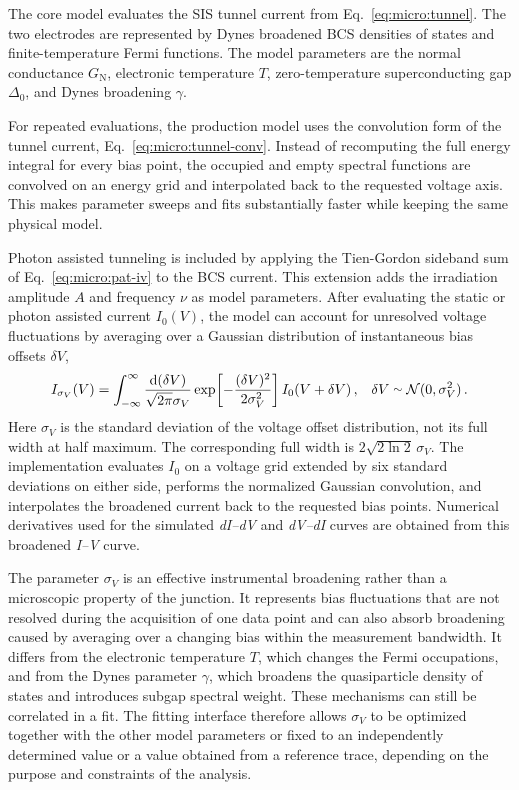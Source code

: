             The core model evaluates the SIS tunnel current from Eq.~\eqref{eq:micro:tunnel}. The two electrodes are represented by Dynes broadened BCS densities of states and finite-temperature Fermi functions. The model parameters are the normal conductance $G_\mathrm{N}$, electronic temperature $T$, zero-temperature superconducting gap $\Delta_0$, and Dynes broadening $\gamma$.

            For repeated evaluations, the production model uses the convolution form of the tunnel current, Eq.~\eqref{eq:micro:tunnel-conv}. Instead of recomputing the full energy integral for every bias point, the occupied and empty spectral functions are convolved on an energy grid and interpolated back to the requested voltage axis. This makes parameter sweeps and fits substantially faster while keeping the same physical model.

            Photon assisted tunneling is included by applying the Tien-Gordon sideband sum of Eq.~\eqref{eq:micro:pat-iv} to the BCS current. This extension adds the irradiation amplitude $A$ and frequency $\nu$ as model parameters. After evaluating the static or photon assisted current $I_0(V)$, the model can account for unresolved voltage fluctuations by averaging over a Gaussian distribution of instantaneous bias offsets $\delta V$,
            \begin{align}
                I_{\sigma_V}(V)
                = \int_{-\infty}^{\infty}
                \frac{\mathrm{d}(\delta V)}{\sqrt{2\pi}\sigma_V}
                \exp\!\left[-\frac{(\delta V)^2}{2\sigma_V^2}\right]
                I_0(V+\delta V)\,,
                &&
                \delta V\ssim\mathcal{N}(0,\sigma_V^2)\,.
                \label{eq:methods:digital:bcs:voltage-broadening}
            \end{align}
            Here $\sigma_V$ is the standard deviation of the voltage offset distribution, not its full width at half maximum. The corresponding full width is $2\sqrt{2\ln 2}\,\sigma_V$. The implementation evaluates $I_0$ on a voltage grid extended by six standard deviations on either side, performs the normalized Gaussian convolution, and interpolates the broadened current back to the requested bias points. Numerical derivatives used for the simulated \textit{dI--dV} and \textit{dV--dI} curves are obtained from this broadened \textit{I--V} curve.

            The parameter $\sigma_V$ is an effective instrumental broadening rather than a microscopic property of the junction. It represents bias fluctuations that are not resolved during the acquisition of one data point and can also absorb broadening caused by averaging over a changing bias within the measurement bandwidth. It differs from the electronic temperature $T$, which changes the Fermi occupations, and from the Dynes parameter $\gamma$, which broadens the quasiparticle density of states and introduces subgap spectral weight. These mechanisms can still be correlated in a fit. The fitting interface therefore allows $\sigma_V$ to be optimized together with the other model parameters or fixed to an independently determined value or a value obtained from a reference trace, depending on the purpose and constraints of the analysis.

